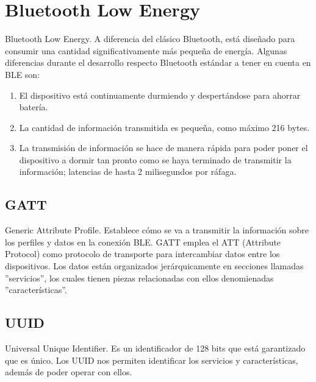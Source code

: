 \section{Bluetooth Low Energy}\label{apendice:ble}
Bluetooth Low Energy. A diferencia del clásico Bluetooth, está diseñado para consumir una cantidad
significativamente más pequeña de energía. Algunas diferencias durante el desarrollo respecto
Bluetooth estándar a tener en cuenta en BLE son:
\begin{enumerate}
	\item El dispositivo está continuamente durmiendo y despertándose para ahorrar batería.
	\item La cantidad de información transmitida es pequeña, como máximo 216 bytes.
	\item La transmisión de información se hace de manera rápida para poder poner el dispositivo
	a dormir tan pronto como se haya terminado de transmitir la información; latencias de hasta
	2 milisegundos por ráfaga.
\end{enumerate}

\subsection{GATT}
Generic Attribute Profile. Establece cómo se va a transmitir la información sobre los perfiles y
datos en la conexión BLE. GATT emplea el ATT (Attribute Protocol) como protocolo de transporte para
intercambiar datos entre los dispositivos. Los datos están organizados jerárquicamente en secciones
llamadas ''servicios'', los cuales tienen piezas relacionadas con ellos denomienadas ''características''.

\subsection{UUID}
Universal Unique Identifier. Es un identificador de 128 bits que está garantizado que es único. Los
UUID nos permiten identificar los servicios y características, además de poder operar con ellos.

